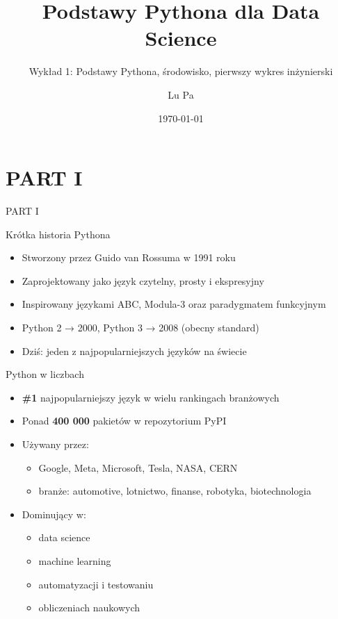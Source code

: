 \documentclass[aspectratio=169]{beamer}
\title{Podstawy Pythona dla Data Science}
\subtitle{Wykład 1: Podstawy Pythona, środowisko, pierwszy wykres inżynierski}
\author{Lu Pa}
\date{\today}
\begin{document}
\begin{frame}
  \titlepage
\end{frame}

\section{PART I}
\begin{frame}[plain]
  \begin{center}
    \vspace{2cm}
    {\color{white}\Huge PART I}
  \end{center}
\end{frame}

\begin{frame}{Krótka historia Pythona}
  \begin{itemize}
    \item Stworzony przez Guido van Rossuma w 1991 roku
    \item Zaprojektowany jako język czytelny, prosty i ekspresyjny
    \item Inspirowany językami ABC, Modula-3 oraz paradygmatem funkcyjnym
    \item Python 2 → 2000, Python 3 → 2008 (obecny standard)
    \item Dziś: jeden z najpopularniejszych języków na świecie
  \end{itemize}
\end{frame}

\begin{frame}{Python w liczbach}
  \begin{itemize}
    \item \textbf{\#1} najpopularniejszy język w wielu rankingach branżowych
    \item Ponad \textbf{400 000} pakietów w repozytorium PyPI
    \item Używany przez:
      \begin{itemize}
        \item Google, Meta, Microsoft, Tesla, NASA, CERN
        \item branże: automotive, lotnictwo, finanse, robotyka, biotechnologia
      \end{itemize}
    \item Dominujący w:
      \begin{itemize}
        \item data science
        \item machine learning
        \item automatyzacji i testowaniu
        \item obliczeniach naukowych
      \end{itemize}
  \end{itemize}
\end{frame}
\end{document}
